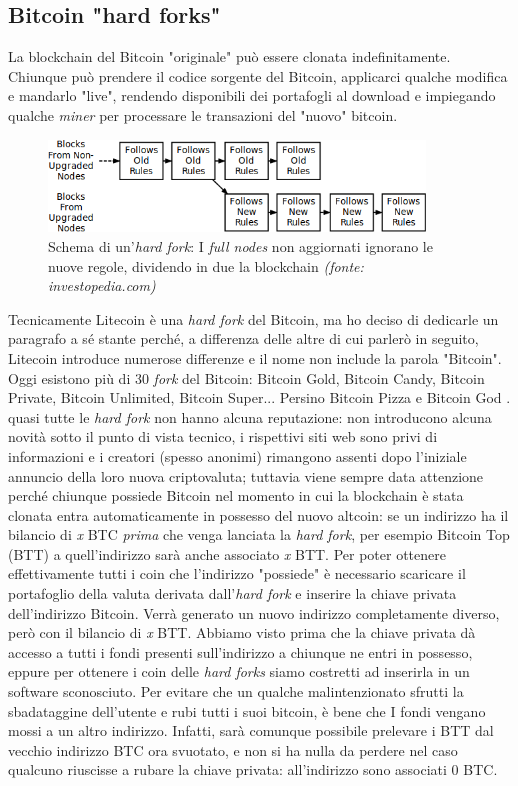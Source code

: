 \documentclass {article}
\begin{document}
\subsection {Bitcoin "hard forks"}


La blockchain del Bitcoin "originale" può essere clonata indefinitamente. Chiunque può prendere il codice sorgente del Bitcoin, applicarci qualche modifica e mandarlo "live", rendendo disponibili dei portafogli al download e impiegando qualche \textit{miner} per processare le transazioni del "nuovo" bitcoin.

\vspace {0.5cm}
\begin{figure}[htb!]
\includegraphics [width = 10cm] {hard_fork.png}
\centering
\caption {Schema di un'\textit{hard fork}: I \textit{full nodes} non aggiornati ignorano le nuove regole, dividendo in due la blockchain \textit{(fonte: investopedia.com)}}
\end{figure}
\vspace {0.2cm}
\noindent
%
Tecnicamente Litecoin è una \textit{hard fork} del Bitcoin, ma ho deciso di dedicarle un paragrafo a sé stante perché, a differenza delle altre di cui parlerò in seguito, Litecoin introduce numerose differenze e il nome non include la parola "Bitcoin".
Oggi esistono più di 30 \textit{fork} del Bitcoin: Bitcoin Gold, Bitcoin Candy, Bitcoin Private, Bitcoin Unlimited, Bitcoin Super... Persino Bitcoin Pizza e Bitcoin God \cite{btcforks}.
quasi tutte le \textit{hard fork} non hanno alcuna reputazione: non introducono alcuna novità sotto il punto di vista tecnico, i rispettivi siti web sono privi di informazioni e i creatori (spesso anonimi) rimangono assenti dopo l'iniziale annuncio della loro nuova criptovaluta; tuttavia viene sempre data attenzione perché chiunque possiede Bitcoin nel momento in cui la blockchain è stata clonata entra automaticamente in possesso del nuovo altcoin: se un indirizzo ha il bilancio di \textit{x} BTC \emph{prima} che venga lanciata la \textit{hard fork}, per esempio Bitcoin Top (BTT) a quell'indirizzo sarà anche associato \textit{x} BTT.
Per poter ottenere effettivamente tutti i coin che l'indirizzo "possiede" è necessario scaricare il portafoglio della valuta derivata dall'\textit{hard fork} e inserire la chiave privata dell'indirizzo Bitcoin.
Verrà generato un nuovo indirizzo completamente diverso, però con il bilancio di \textit{x} BTT.
Abbiamo visto prima che la chiave privata dà accesso a tutti i fondi presenti sull'indirizzo a chiunque ne entri in possesso, eppure per ottenere i coin delle \textit{hard forks} siamo costretti ad inserirla in un software sconosciuto.
Per evitare che un qualche malintenzionato sfrutti la sbadataggine dell'utente e rubi tutti i suoi bitcoin, è bene che I fondi vengano mossi a un altro indirizzo.
Infatti, sarà comunque possibile prelevare i BTT dal vecchio indirizzo BTC ora svuotato, e non si ha nulla da perdere nel caso qualcuno riuscisse a rubare la chiave privata: all'indirizzo sono associati 0 BTC.
\end{document}
